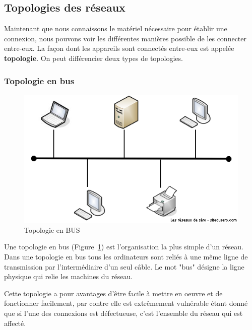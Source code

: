 \subsection{Topologies des réseaux}
Maintenant que nous connaissons le matériel nécessaire pour établir une connexion, nous pouvons voir les différentes manières possible de les connecter entre-eux. La façon dont les appareils sont connectés entre-eux est appelée \textbf{topologie}. On peut différencier deux types de topologies.



\subsubsection{Topologie en bus}
\begin{figure}[h!]
  \centering
  \includegraphics[width=.4\textwidth]{images/topologies/topologieBus}
  \caption{Topologie en BUS}
  \label{fig:topoBus}
\end{figure}
Une topologie en bus (Figure~\ref{fig:topoBus}) est l'organisation la plus simple d'un réseau. Dans une topologie en bus tous les ordinateurs sont reliés à une même ligne de transmission par l'intermédiaire d'un seul câble. Le mot "bus" désigne la ligne physique qui relie les machines du réseau.

Cette topologie a pour avantages d'être {facile à mettre en oeuvre} et de fonctionner facilement, par contre elle est extrêmement {vulnérable} étant donné que si l'une des connexions est défectueuse, c'est l'ensemble du réseau qui est affecté.

